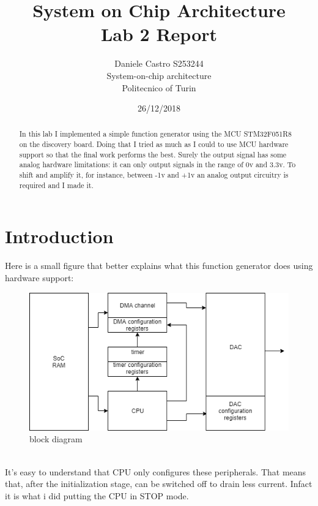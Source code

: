 \documentclass[peerreview]{IEEEtran}
\begin{document}
\title{System on Chip Architecture \\ Lab 2 Report}


\author{Daniele Castro S253244\\
System-on-chip architecture\\
Politecnico of Turin\\
}
\date{26/12/2018}

\maketitle
\tableofcontents
\listoffigures

\IEEEpeerreviewmaketitle
\begin{abstract}
In this lab I implemented a simple function generator using the MCU STM32F051R8 on the discovery board. Doing that I tried as much as I could to use MCU hardware support so that the final work performs the best. Surely the output signal has some analog hardware limitations: it can only output signals in the range of 0v and 3.3v. To shift and amplify it, for instance, between -1v and +1v an analog output circuitry is required and I made it.
\end{abstract}
\section{Introduction}
Here is a small figure that better explains what this function generator does using hardware support:
\begin{figure}[!ht]
\centering
\includegraphics[width=0.8\columnwidth]{DAC} 
\caption{block diagram}
\label{fig_sim}
\end{figure}
\\It's easy to understand that CPU only configures these peripherals. That means that, after the initialization stage, can be switched off to drain less current. Infact it is what i did putting the CPU in STOP mode.
\end{document}
